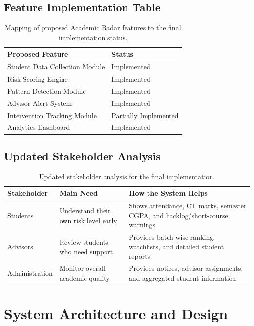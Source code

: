 \documentclass[12pt,a4paper]{article}
\begin{document}
\subsection{Feature Implementation Table}
\begin{table}[H]
\centering
\small
\begin{tabular}{L{8cm}L{3cm}}
\toprule
\textbf{Proposed Feature} & \textbf{Status} \\
\midrule
Student Data Collection Module & Implemented \\
Risk Scoring Engine & Implemented \\
Pattern Detection Module & Implemented \\
Advisor Alert System & Implemented \\
Intervention Tracking Module & Partially Implemented \\
Analytics Dashboard & Implemented \\
\bottomrule
\end{tabular}
\caption{Mapping of proposed Academic Radar features to the final implementation status.}
\end{table}

\subsection{Updated Stakeholder Analysis}
\begin{table}[H]
\centering
\small
\begin{tabular}{L{3cm}L{4.8cm}L{4.8cm}}
\toprule
\textbf{Stakeholder} & \textbf{Main Need} & \textbf{How the System Helps} \\
\midrule
Students & Understand their own risk level early & Shows attendance, CT marks, semester CGPA, and backlog/short-course warnings \\
Advisors & Review students who need support & Provides batch-wise ranking, watchlists, and detailed student reports \\
Administration & Monitor overall academic quality & Provides notices, advisor assignments, and aggregated student information \\
\bottomrule
\end{tabular}
\caption{Updated stakeholder analysis for the final implementation.}
\end{table}

\section{System Architecture and Design}
\end{document}

